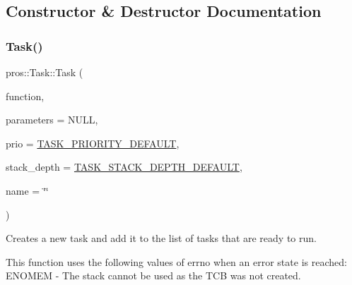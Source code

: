 \subsection{Constructor \& Destructor Documentation}
\mbox{\label{classpros_1_1Task_a938ee60b49f29d743315bf05ee9f4a56}} 
\subsubsection{\texorpdfstring{Task()}{Task()}\hspace{0.1cm}{\footnotesize\ttfamily [1/5]}}
{\footnotesize\ttfamily pros\+::\+Task\+::\+Task (\begin{DoxyParamCaption}\item[{\hyperlink{rtos_8h_aece0aa29b1f1538115228d2197239f98}{task\+\_\+fn\+\_\+t}}]{function,  }\item[{void $\ast$}]{parameters = {\ttfamily NULL},  }\item[{std\+::uint32\+\_\+t}]{prio = {\ttfamily \hyperlink{rtos_8h_a3082a7e8f15691441dba683711bb823f}{T\+A\+S\+K\+\_\+\+P\+R\+I\+O\+R\+I\+T\+Y\+\_\+\+D\+E\+F\+A\+U\+LT}},  }\item[{std\+::uint16\+\_\+t}]{stack\+\_\+depth = {\ttfamily \hyperlink{rtos_8h_a9ffb33b9e3714ca949d9f45dde3cbf8f}{T\+A\+S\+K\+\_\+\+S\+T\+A\+C\+K\+\_\+\+D\+E\+P\+T\+H\+\_\+\+D\+E\+F\+A\+U\+LT}},  }\item[{const char $\ast$}]{name = {\ttfamily \char`\"{}\char`\"{}} }\end{DoxyParamCaption})}



Creates a new task and add it to the list of tasks that are ready to run. 

This function uses the following values of errno when an error state is reached\+: E\+N\+O\+M\+EM -\/ The stack cannot be used as the T\+CB was not created.


